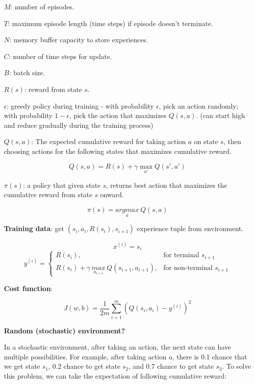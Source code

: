\documentclass{article}
\begin{document}
\noindent \(M\): number of episodes.

\noindent \(T\): maximum episode length (time steps) if episode doesn't terminate.

\noindent \(N\): memory buffer capacity to store experiences.

\noindent \(C\): number of time steps for update.

\noindent \(B\): batch size.

\noindent \(R(s)\): reward from state \(s\).

\noindent \(\epsilon\): greedy policy during training - with probability \(\epsilon\), pick an action randomly; with probability \(1 - \epsilon\), pick the action that maximizes \(Q(s, a)\). (can start high and reduce gradually during the training process)

\bigskip

\noindent \(Q(s, a)\): The expected cumulative reward for taking action \(a\) on state \(s\), then choosing actions for the following states that maximizes cumulative reward.

\[Q(s, a) = R(s) + \gamma \max_{a'} Q(s', a')\]

\noindent \(\pi(s)\): a policy that given state \(s\), returns best action that maximizes the cumulative reward from state \(s\) onward.

\[\pi(s) = \underset{a}{argmax} \ Q(s, a)\]

\noindent \textbf{Training data}: get \((s_{i}, a_{i}, R(s_{i}), s_{i+1})\) experience tuple from environment.

\[x^{(i)} = s_{i}\]
\[
y^{(i)} =
\begin{cases}
  R(s_{i}), & \text{for terminal } s_{i+1} \\
  R(s_{i}) + \gamma \ \underset{a_{i+1}}{max} \ Q(s_{i+1}, a_{i+1}), & \text{for non-terminal } s_{i+1}
\end{cases}
\]

\noindent \textbf{Cost function}:

\[J(w, b) = \frac{1}{2m} \sum_{i = 1}^m (Q(s_{i}, a_{i}) - y^{(i)})^2\]

\noindent \textbf{Random (stochastic) environment?}

\noindent In a stochastic environment, after taking an action, the next state can have multiple possibilities. For example, after taking action \(a\), there is 0.1 chance that we get state \(s_1\), 0.2 chance to get state \(s_2\), and 0.7 chance to get state \(s_3\). To solve this problem, we can take the expectation of following cumulative reward:
\end{document}
